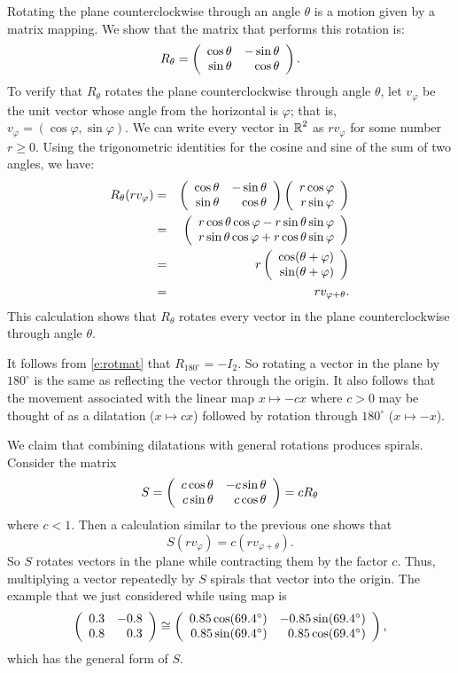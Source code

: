 \documentclass{ximera}
\begin{document}
Rotating the plane counterclockwise through an angle $\theta$ is
a motion given by a matrix mapping.  We show that the matrix that
performs this rotation is:
\begin{equation} \label{e:rotmat}
R_\theta = \left(\begin{array}{rr} \cos\theta & -\sin\theta\\ \sin\theta &\cos\theta\end{array}\right).
\end{equation}
To verify that $R_\theta$ rotates the plane counterclockwise
through angle $\theta$, let $v_\varphi$ be the unit vector whose
angle from the horizontal is $\varphi$; that is,
$v_\varphi=(\cos\varphi,\sin\varphi)$.  We can write every vector in
$\mbox{$\Bbb{R}$}^2$ as $rv_\varphi$ for some number $r\ge 0$.   Using the 
trigonometric identities for the cosine and sine of the sum of two angles, we
have:
\begin{eqnarray*}
R_\theta (rv_\varphi) & = &
\left(\begin{array}{rr} \cos\theta & -\sin\theta\\ \sin\theta &\cos\theta\end{array}\right)
\left(\begin{array}{r} r\cos\varphi \\ r\sin\varphi\end{array}\right) \\
& = & \left(\begin{array}{r} r\cos\theta\cos\varphi -r\sin\theta\sin\varphi \\ r\sin\theta\cos\varphi + r\cos\theta\sin\varphi\end{array}\right)\\
& = & r\left(\begin{array}{r} \cos(\theta+\varphi) \\ \sin(\theta+\varphi)\end{array}\right)  \\
& = & rv_{\varphi+\theta}.
\end{eqnarray*}
This calculation shows that $R_\theta$ rotates every vector in the plane
counterclockwise through angle $\theta$.

It follows from \eqref{e:rotmat} that $R_{180^\circ} = -I_2$.  So rotating a
vector in the plane by $180^\circ$ is the same as reflecting the vector
through the origin.  It also follows that the movement associated with the
linear map $x\mapsto -cx$ where $c>0$ may be thought of as a dilatation
($x\mapsto cx$) followed by rotation through $180^\circ$ ($x\mapsto -x$).

We claim that combining dilatations with general rotations produces spirals.  
Consider the matrix
\[
S = \left(\begin{array}{rr} c\cos\theta & -c\sin\theta\\ c\sin\theta &c\cos\theta\end{array}\right) = cR_\theta
\]
where $c<1$.  Then a calculation similar to the previous one shows that
\[
S(rv_\varphi) = c(rv_{\varphi+\theta}).
\]
So $S$ rotates vectors in the plane while contracting them by
the factor $c$.  Thus, multiplying a vector repeatedly by $S$ 
spirals that vector into the origin.  The example that we just 
considered while using {\sf map} is
\[
\left(\begin{array}{rr} 0.3 & -0.8\\ 0.8 &0.3\end{array}\right)\cong\left(\begin{array}{rr} 0.85\cos(69.4^\circ) & -0.85\sin(69.4^\circ)\\ 0.85\sin(69.4^\circ) &0.85\cos(69.4^\circ)\end{array}\right),
\]
which has the general form of $S$.
\end{document}
